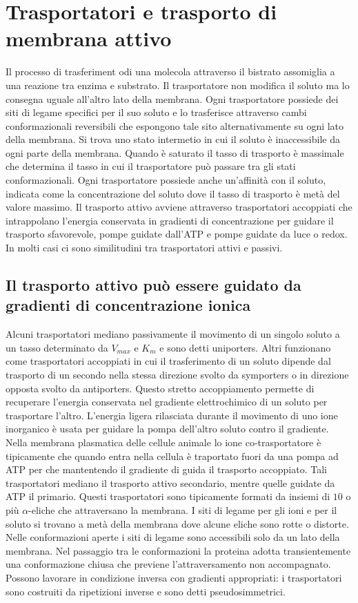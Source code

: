\section{Trasportatori e trasporto di membrana attivo}
Il processo di trasferiment odi una molecola attraverso il bistrato assomiglia a una reazione tra enzima e substrato. Il trasportatore non modifica il soluto ma lo consegna uguale 
all'altro lato della membrana. Ogni trasportatore possiede dei siti di legame specifici per il suo soluto e lo trasferisce attraverso cambi conformazionali reversibili che espongono 
tale sito alternativamente su ogni lato della membrana. Si trova uno stato intermetio in cui il soluto \`e inaccessibile da ogni parte della membrana. Quando \`e saturato il tasso di
trasporto \`e massimale che determina il tasso in cui il trasportatore pu\`o passare tra gli stati conformazionali. Ogni trasportatore possiede anche un'affinit\`a con il soluto, 
indicata come la concentrazione del soluto dove il tasso di trasporto \`e met\`a del valore massimo. Il trasporto attivo avviene attraverso trasportatori accoppiati che intrappolano
l'energia conservata in gradienti di concentrazione per guidare il trasporto sfavorevole, pompe guidate dall'ATP e pompe guidate da luce o redox. In molti casi ci sono similitudini
tra trasportatori attivi e passivi. 
\subsection{Il trasporto attivo pu\`o essere guidato da gradienti di concentrazione ionica}
Alcuni trasportatori mediano passivamente il movimento di un singolo soluto a un tasso determinato da $V_{max}$ e $K_m$ e sono detti uniporters. Altri funzionano come trasportatori
accoppiati in cui il trasferimento di un soluto dipende dal trasporto di un secondo nella stessa direzione svolto da symporters o in direzione opposta svolto da antiporters. Questo 
stretto accoppiamento permette di recuperare l'energia conservata nel gradiente elettrochimico di un soluto per trasportare l'altro. L'energia ligera rilasciata durante il movimento di
uno ione inorganico \`e usata per guidare la pompa dell'altro soluto contro il gradiente. Nella membrana plasmatica delle cellule animale lo ione co-trasportatore \`e tipicamente 
 che quando entra nella cellula \`e traportato fuori da una pompa ad ATP per  che mantentendo il gradiente di  guida il trasporto accoppiato. Tali 
trasportatori mediano il trasporto attivo secondario, mentre quelle guidate da ATP il primario. Questi trasportatori sono tipicamente formati da insiemi di $10$ o pi\`u $\alpha$-eliche
che attraversano la membrana. I siti di legame per gli ioni e per il soluto si trovano a met\`a della membrana dove alcune eliche sono rotte o distorte. Nelle conformazioni aperte 
i siti di legame sono accessibili solo da un lato della membrana. Nel passaggio tra le conformazioni la proteina adotta transientemente una conformazione chiusa che previene 
l'attraversamento non accompagnato. Possono lavorare in condizione inversa con gradienti appropriati: i trasportatori sono costruiti da ripetizioni inverse e sono detti pseudosimmetrici.
